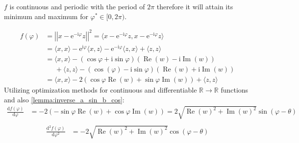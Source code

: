 		\begin{Proof}
			$f$ is continuous and periodic with the period of $2\pi$ therefore it will attain its minimum and maximum 
      for $\varphi^\ast \in [0,2\pi)$\cite{Rudin1976}. 
			
      
      

      
      
      
      
      
			\begin{equation}
				\begin{split}
				f(\varphi) &= \left|\left|x-\mathrm{e}^{-\mathrm{i}\varphi}z\right|\right|^2 = 
				\langle x-\mathrm{e}^{-\mathrm{i}\varphi}z,x-\mathrm{e}^{-\mathrm{i}\varphi}z \rangle\\
						   &= \langle x,x \rangle - \mathrm{e}^{\mathrm{i}\varphi}\langle x,z \rangle-\mathrm{e}^{-\mathrm{i}\varphi}\langle z,x \rangle+\langle z,z \rangle \\
               &= \langle x,x \rangle - (\cos\varphi+\mathrm{i}\sin\varphi)\left(\operatorname{Re}(w) -\mathrm{i}\operatorname{Im}(w)\right)\\
						   &\;\;\;\;\; + \langle z,z \rangle - (\cos(\varphi)-\mathrm{i}\sin\varphi)\left(\operatorname{Re}(w)+\mathrm{i}\operatorname{Im}(w)\right)\\
						   &= \langle x,x \rangle - 2\left(\cos\varphi\operatorname{Re}(w)+\sin\varphi\operatorname{Im}(w)\right)+ \langle z,z \rangle
				\end{split}
			  \end{equation}
			  Utilizing optimization methods for continuous and differentiable $\mathbb{R} \rightarrow \mathbb{R}$ functions \cite{Boyd2004}\cite{Nocedal2006} and also \cref{lemma:inverse_a_sin_b_cos}:
			  \begin{equation}
				\begin{split}
				\frac{\mathrm{d}f(\varphi)}{\mathrm{d}\varphi} &= - 2\left(-\sin\varphi\operatorname{Re}(w)+\cos\varphi\operatorname{Im}(w)\right) = 2\sqrt{\operatorname{Re}(w)^2+\operatorname{Im}(w)^2}\sin(\varphi-\theta)\\ 
				\end{split}
			  \end{equation}
			  \begin{equation}
				\begin{split}
				\frac{\mathrm{d}^2f(\varphi)}{\mathrm{d}\varphi^2} &= -2\sqrt{\operatorname{Re}(w)^2+\operatorname{Im}(w)^2}\cos(\varphi-\theta)\\ 

\end{split}
\end{equation}
\end{Proof}
